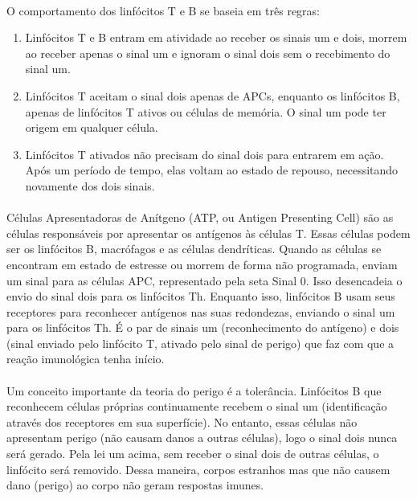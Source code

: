 \documentclass{article}
\begin{document}
\paragraph{}O comportamento dos linfócitos T e B se baseia em três regras:

\begin{enumerate}
\item Linfócitos T e B entram em atividade ao receber os sinais um e dois, morrem ao receber apenas o sinal um e ignoram o sinal dois sem o recebimento do sinal um.
\item Linfócitos T aceitam o sinal dois apenas de APCs, enquanto os linfócitos B, apenas de linfócitos T ativos ou células de memória. O sinal um pode ter origem em qualquer célula.
\item Linfócitos T ativados não precisam do sinal dois para entrarem em ação. Após um período de tempo, elas voltam ao estado de repouso, necessitando novamente dos dois sinais.
\end{enumerate}

\paragraph{}Células Apresentadoras de Anítgeno (ATP, ou Antigen Presenting Cell) são as células responsáveis por apresentar os antígenos às células T. Essas células podem ser os linfócitos B, macrófagos e as células dendríticas. Quando as células se encontram em estado de estresse ou morrem de forma não programada, enviam um sinal para as células APC, representado pela seta Sinal 0. Isso desencadeia o envio do sinal dois para os linfócitos Th. Enquanto isso, linfócitos B usam seus receptores para reconhecer antígenos nas suas redondezas, enviando o sinal um para os linfócitos Th. É o par de sinais um (reconhecimento do antígeno) e dois (sinal enviado pelo linfócito T, ativado pelo sinal de perigo) que faz com que a reação imunológica tenha início.

\paragraph{}Um conceito importante da teoria do perigo é a tolerância. Linfócitos B que reconhecem células próprias continuamente recebem o sinal um (identificação através dos receptores em sua superfície). No entanto, essas células não apresentam perigo (não causam danos a outras células), logo o sinal dois nunca será gerado. Pela lei um acima, sem receber o sinal dois de outras células, o linfócito será removido. Dessa maneira, corpos estranhos mas que não causem dano (perigo) ao corpo não geram respostas imunes.
\end{document}
